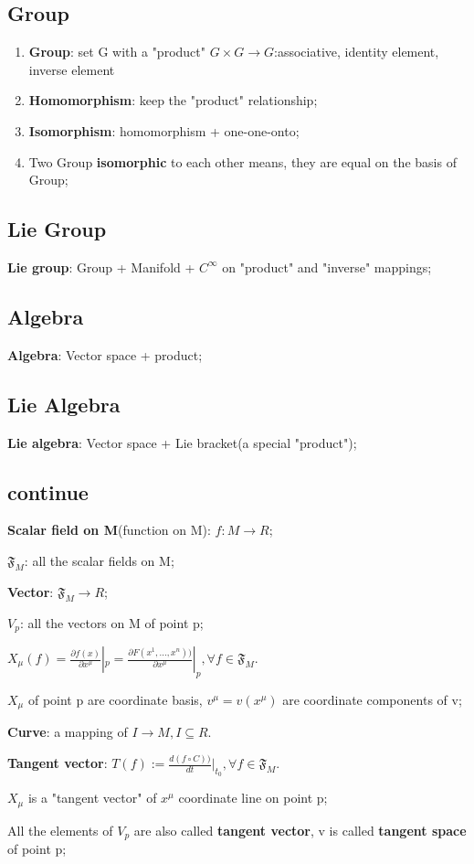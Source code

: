 \documentclass[12pt]{article}
\numberwithin{equation}{section}
\begin{document}
\subsection{Group}
	\begin{enumerate}
	\item \textbf{Group}: set G with a "product" $G\times G\rightarrow G$:associative, identity element, inverse element
	\item \textbf{Homomorphism}: keep the "product" relationship;
	\item \textbf{Isomorphism}: homomorphism + one-one-onto;
	\item Two Group \textbf{isomorphic} to each other means, they are equal on the basis of Group;
	\end{enumerate}
\subsection{Lie Group}
	\textbf{Lie group}: Group + Manifold + $C^\infty$ on "product" and "inverse" mappings;
\subsection{Algebra}
	\textbf{Algebra}: Vector space + product;
\subsection{Lie Algebra}
	\textbf{Lie algebra}: Vector space + Lie bracket(a special "product");	
\subsection{continue}
	\textbf{Scalar field on M}(function on M): $f:M \rightarrow R$; \par
	$\mathfrak{F}_M$: all the scalar fields on M; \par
	\textbf{Vector}: $\mathfrak{F}_M\rightarrow R$; \par
	$V_p$: all the vectors on M of point p; \par
	$X_\mu(f)=\frac{\partial f(x)}{\partial x^\mu}|_p = \frac{\partial F(x^1,...,x^n))}{\partial x^\mu}|_p, \forall f \in \mathfrak{F}_M$. \par
	${X_\mu}$ of point p are coordinate basis, $v^\mu=v(x^\mu)$ are coordinate components of v;\par
	\textbf{Curve}: a mapping of $I\rightarrow M, I\subseteq R$.\par
	\textbf{Tangent vector}: $T(f):=\frac{d(f\circ C))}{dt}|_{t_0}, \forall f \in \mathfrak{F}_M$.\par
	$X_\mu$ is a "tangent vector" of $x^\mu$ coordinate line on point p;\par
	All the elements of $V_p$ are also called \textbf{tangent vector}, v is called \textbf{tangent space} of point p;

\renewcommand\refname{Reference}



  \clearpage
\end{document}

